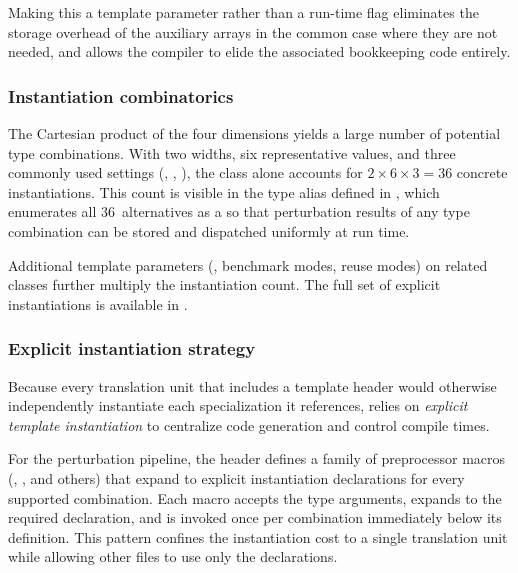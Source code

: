 \noindent
Making this a template parameter rather than a run-time flag eliminates
the storage overhead of the auxiliary arrays in the common case where
they are not needed, and allows the compiler to elide the associated
bookkeeping code entirely.


\subsubsection{Instantiation combinatorics}
\label{subsec:template-combinatorics}

The Cartesian product of the four dimensions yields a large number of
potential type combinations.  With two  widths, six
representative  values, and three commonly used
 settings (, ,
), the  class
alone accounts for $2\times 6\times 3 = 36$ concrete instantiations.
This count is visible in the  type alias defined
in , which enumerates all 36~alternatives as a
 so that perturbation results of any type
combination can be stored and dispatched uniformly at run time.

Additional template parameters (, benchmark modes, reuse
modes) on related classes further multiply the instantiation count.  The
full set of explicit instantiations is available in
.


\subsubsection{Explicit instantiation strategy}
\label{subsec:template-explicit-inst}

Because every translation unit that includes a template header would
otherwise independently instantiate each specialization it references,
\FractalShark{} relies on \emph{explicit template instantiation} to
centralize code generation and control compile times.

For the perturbation pipeline, the header
 defines a family of preprocessor macros
(,
, and others) that
expand to explicit instantiation declarations for every supported
 combination.  Each macro accepts
the type arguments, expands to the required  declaration,
and is invoked once per combination immediately below its definition.
This pattern confines the instantiation cost to a single translation
unit while allowing other files to use only the declarations.

